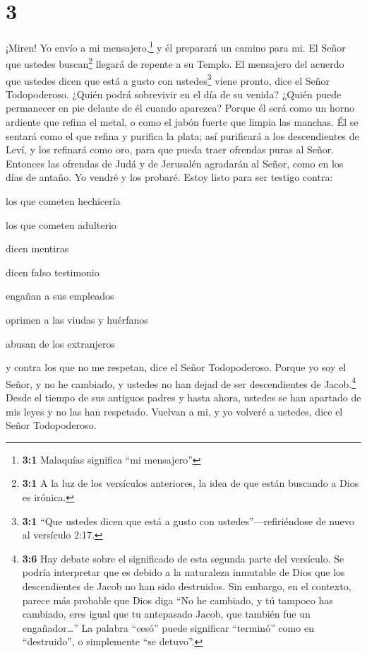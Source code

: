 \hypertarget{section-2}{%
\section{3}\label{section-2}}

 ¡Miren! Yo envío a mi mensajero,\footnote{\textbf{3:1}
  Malaquías significa ``mi mensajero''} y él preparará un camino para
mi. El Señor que ustedes buscan\footnote{\textbf{3:1} A la luz de los
  versículos anteriores, la idea de que están buscando a Dios es
  irónica.} llegará de repente a su Templo. El mensajero del acuerdo que
ustedes dicen que está a gusto con ustedes\footnote{\textbf{3:1} ``Que
  ustedes dicen que está a gusto con ustedes''---refiriéndose de nuevo
  al versículo 2:17.} viene pronto, dice el Señor Todopoderoso.
 ¿Quién podrá sobrevivir en el día de su venida? ¿Quién
puede permanecer en pie delante de él cuando aparezca? Porque él será
como un horno ardiente que refina el metal, o como el jabón fuerte que
limpia las manchas.  Él se sentará como el que refina y
purifica la plata; así purificará a los descendientes de Leví, y los
refinará como oro, para que pueda traer ofrendas puras al Señor.
 Entonces las ofrendas de Judá y de Jerusalén agradarán al
Señor, como en los días de antaño.  Yo vendré y los probaré.
Estoy listo para ser testigo contra:

los que cometen hechicería

los que cometen adulterio

dicen mentiras

dicen falso testimonio

engañan a sus empleados

oprimen a las viudas y huérfanos

abusan de los extranjeros

y contra los que no me respetan, dice el Señor Todopoderoso.
 Porque yo soy el Señor, y no he cambiado, y ustedes no han
dejad de ser descendientes de Jacob.\footnote{\textbf{3:6} Hay debate
  sobre el significado de esta segunda parte del versículo. Se podría
  interpretar que es debido a la naturaleza inmutable de Dios que los
  descendientes de Jacob no han sido destruidos. Sin embargo, en el
  contexto, parece más probable que Dios diga ``No he cambiado, y tú
  tampoco has cambiado, eres igual que tu antepasado Jacob, que también
  fue un engañador\ldots{}'' La palabra ``cesó'' puede significar
  ``terminó'' como en ``destruido'', o simplemente ``se detuvo''.}
 Desde el tiempo de sus antiguos padres y hasta ahora,
ustedes se han apartado de mis leyes y no las han respetado. Vuelvan a
mi, y yo volveré a ustedes, dice el Señor Todopoderoso.

